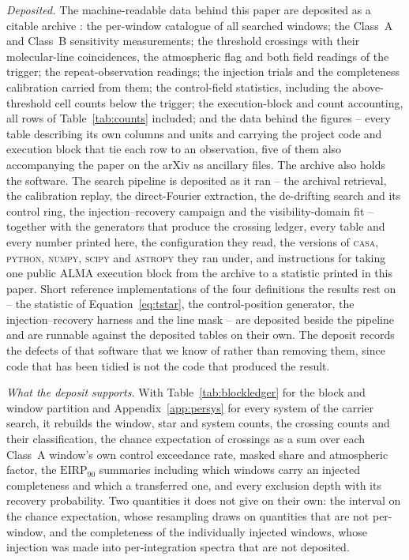 \emph{Deposited.} The machine-readable data behind this paper are deposited as
a citable archive \citep{SIdeposit}: the per-window catalogue of all
\NWindows{} searched windows; the Class~A and Class~B sensitivity measurements;
the \EvNCrossRaw{} threshold crossings with their molecular-line coincidences,
the atmospheric flag and both field readings of the trigger; the
repeat-observation readings; the injection trials and the completeness
calibration carried from them; the control-field statistics, including the
above-threshold cell counts below the trigger; the execution-block and count
accounting, all \MtCountRows{} rows of Table~\ref{tab:counts} included; and the
data behind the figures -- every table describing its own columns and units and
carrying the project code and execution block that tie each row to an
observation, five of them also accompanying the paper on the arXiv as ancillary
files. The archive also holds the software. The search pipeline is deposited as it
ran -- the archival retrieval, the calibration replay, the direct-Fourier
extraction, the de-drifting search and its control ring, the
injection--recovery campaign and the visibility-domain fit -- together with
the generators that produce the crossing ledger, every table and every number
printed here, the configuration they read, the versions of \textsc{casa},
\textsc{python}, \textsc{numpy}, \textsc{scipy} and \textsc{astropy} they ran
under, and instructions for taking one public ALMA execution block from the
archive to a statistic printed in this paper. Short reference implementations
of the four definitions the results rest on -- the statistic of
Equation~\ref{eq:tstar}, the control-position generator, the
injection--recovery harness and the line mask -- are deposited beside the
pipeline and are runnable against the deposited tables on their own. The
deposit records the defects of that software that we know of rather than
removing them, since code that has been tidied is not the code that
produced the result.

\emph{What the deposit supports.} With Table~\ref{tab:blockledger} for the
block and window partition and Appendix~\ref{app:persys} for every system of
the carrier search, it rebuilds the window, star and system counts, the
crossing counts and their classification, the chance expectation of \CeExp{}
crossings as a sum over each Class~A window's own control exceedance rate,
masked share and atmospheric factor, the $\mathrm{EIRP}_{90}$ summaries
including which windows carry an injected completeness and which a transferred
one, and every exclusion depth with its recovery probability. Two quantities it
does not give on their own: the interval on the chance expectation, whose
resampling draws on quantities that are not per-window, and the completeness of
the individually injected windows, whose injection was made into
per-integration spectra that are not deposited.


